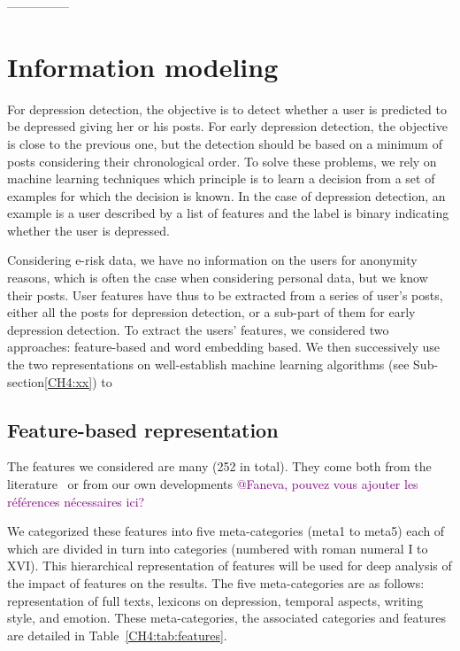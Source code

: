 \documentclass[graybox]{svmult}
\newcommand{\jm}[1]{\textcolor{purple}{{  #1}}}
\begin{document}
---------------

\section{Information modeling}
For depression detection, the objective is to detect whether a user is predicted to be depressed giving her or his posts. For early depression detection, the objective is close to the previous one, but the detection should be based on a minimum of posts considering their chronological order. To solve these problems, we rely on machine learning techniques which principle is to learn a decision from a set of examples for which the decision is known. In the case of depression detection, an example is a user described by a list of features and the label is binary indicating whether the user is depressed. 

Considering e-risk data, we have no information on the users for anonymity reasons, which is often the case when considering personal data, but we know their posts. User features have thus to be extracted from a series of user's posts, either all the posts for depression detection, or a sub-part of them for early depression detection. To extract the users' features, we considered two approaches: feature-based and word embedding based. We  then successively use the two representations on well-establish machine learning algorithms (see Sub-section\ref{CH4:xx}) to 






\subsection{Feature-based representation}
\label{CH4:sec:sub:featurerepresentation}


The features we considered are many (252 in total). They come both from the  literature~\cite{Choudhury2013,ChoudhuryCHH14} or from our own developments
\jm{@Faneva, pouvez vous ajouter les références nécessaires ici?}

We categorized these features into five meta-categories (meta1 to meta5) each of which are  divided in turn into categories (numbered with roman numeral I to XVI). This hierarchical representation of features will be used for deep analysis of the impact of features on the results. 
The five meta-categories are as follows: representation of full texts, lexicons on depression, temporal aspects, writing style,  and emotion. These meta-categories, the associated categories and features are detailed in Table~\ref{CH4:tab:features}. 
\end{document}

